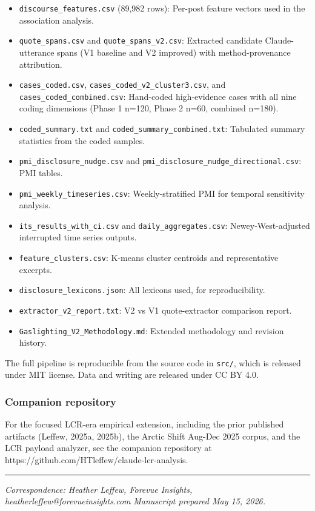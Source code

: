 \documentclass[11pt]{article}
\begin{document}
\begin{itemize}[leftmargin=*]
  \item \texttt{discourse\_features.csv} (89,982 rows): Per-post feature vectors used in the association analysis.
  \item \texttt{quote\_spans.csv} and \texttt{quote\_spans\_v2.csv}: Extracted candidate Claude-utterance spans (V1 baseline and V2 improved) with method-provenance attribution.
  \item \texttt{cases\_coded.csv}, \texttt{cases\_coded\_v2\_cluster3.csv}, and \texttt{cases\_coded\_combined.csv}: Hand-coded high-evidence cases with all nine coding dimensions (Phase 1 n=120, Phase 2 n=60, combined n=180).
  \item \texttt{coded\_summary.txt} and \texttt{coded\_summary\_combined.txt}: Tabulated summary statistics from the coded samples.
  \item \texttt{pmi\_disclosure\_nudge.csv} and \texttt{pmi\_disclosure\_nudge\_directional.csv}: PMI tables.
  \item \texttt{pmi\_weekly\_timeseries.csv}: Weekly-stratified PMI for temporal sensitivity analysis.
  \item \texttt{its\_results\_with\_ci.csv} and \texttt{daily\_aggregates.csv}: Newey-West-adjusted interrupted time series outputs.
  \item \texttt{feature\_clusters.csv}: K-means cluster centroids and representative excerpts.
  \item \texttt{disclosure\_lexicons.json}: All lexicons used, for reproducibility.
  \item \texttt{extractor\_v2\_report.txt}: V2 vs V1 quote-extractor comparison report.
  \item \texttt{Gaslighting\_V2\_Methodology.md}: Extended methodology and revision history.
\end{itemize}

The full pipeline is reproducible from the source code in \texttt{src/}, which is released under MIT license. Data and writing are released under CC BY 4.0.

\subsubsection{Companion repository}

For the focused LCR-era empirical extension, including the prior published artifacts (Leffew, 2025a, 2025b), the Arctic Shift Aug-Dec 2025 corpus, and the LCR payload analyzer, see the companion repository at https://github.com/HTleffew/claude-lcr-analysis.

\bigskip\hrule\bigskip

\emph{Correspondence: Heather Leffew, Forevue Insights, heatherleffew@forevueinsights.com} \emph{Manuscript prepared May 15, 2026.}
\end{document}
